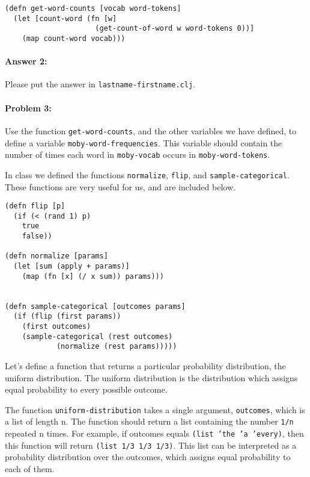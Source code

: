 \documentclass[10pt]{article}
\begin{document}
\begin{lstlisting}
(defn get-word-counts [vocab word-tokens]
  (let [count-word (fn [w] 
                     (get-count-of-word w word-tokens 0))]
    (map count-word vocab)))
\end{lstlisting}

\paragraph{Answer 2:} Please put the answer in
\texttt{lastname-firstname.clj}.

\hrulefill
\paragraph{Problem 3:}

Use the function \texttt{get-word-counts}, and the other variables we have
defined, to define a variable \texttt{moby-word-frequencies}. This variable
should contain the number of times each word in \texttt{moby-vocab} occurs in
\texttt{moby-word-tokens}.

In class we defined the functions \texttt{normalize}, \texttt{flip},
and \texttt{sample-categorical}. These functions are very useful for
us, and are included below.

\begin{lstlisting}
(defn flip [p]
  (if (< (rand 1) p)
    true
    false))

(defn normalize [params]
  (let [sum (apply + params)]
    (map (fn [x] (/ x sum)) params)))


(defn sample-categorical [outcomes params]
  (if (flip (first params))
    (first outcomes)
    (sample-categorical (rest outcomes) 
			(normalize (rest params)))))
\end{lstlisting}

Let's define a function that returns a particular probability
distribution, the uniform distribution. The uniform distribution is
the distribution which assigns equal probability to every possible
outcome.
  
The function \texttt{uniform-distribution} takes a single argument,
\texttt{outcomes}, which is a list of length n. The function should
return a list containing the number \texttt{1/n} repeated n times. For
example, if outcomes equals \texttt{(list 'the 'a 'every)}, then this
function will return \texttt{(list 1/3 1/3 1/3)}. This list can be
interpreted as a probability distribution over the outcomes, which
assigns equal probability to each of them.
\end{document}
